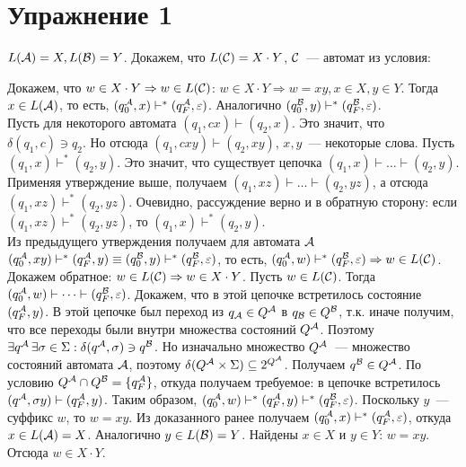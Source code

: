 \documentclass[a4paper]{article}
\def\A{{\cal A}}
\def\B{{\cal B}}
\def\C{{\cal C}}
\begin{document}
\section*{Упражнение 1}
$L(\A)=X,L(\B)=Y$. Докажем, что $L(\C)=X\cdot Y$, $\C$~--- автомат из условия:
\begin{center}
\end{center}
Докажем, что $w\in X\cdot Y\Rightarrow w\in L(\C)$:\newline
$w\in X\cdot Y\Rightarrow w=xy, x\in X, y\in Y$. Тогда $x\in L(\A)$, то есть, $(q_0^\A,x)\vdash^*(q_F^\A,\varepsilon)$. Аналогично $(q_0^\B,y)\vdash^*(q_F^\B,\varepsilon)$.
\\[5pt]
Пусть для некоторого автомата $(q_1,cx)\vdash(q_2,x)$. Это значит, что $\delta(q_1,c)\ni q_2$. Но отсюда $(q_1,cxy)\vdash(q_2,xy)$, $x,y$~--- некоторые слова. Пусть $(q_1,x)\vdash^*(q_2,y)$. Это значит, что существует цепочка $(q_1,x)\vdash\dots\vdash(q_2,y)$. Применяя утверждение выше, получаем $(q_1,xz)\vdash\dots\vdash(q_2,yz)$, а отсюда $(q_1,xz)\vdash^*(q_2,yz)$. Очевидно, рассуждение верно и в обратную сторону: если $(q_1,xz)\vdash^*(q_2,yz)$, то $(q_1,x)\vdash^*(q_2,y)$.
\\[5pt]
Из предыдущего утверждения получаем для автомата $\A$ $(q_0^\A,xy)\vdash^*(q_F^\A,y)\equiv(q_0^\B,y)\vdash^*(q^\B_F,\varepsilon)$, то есть, $(q_0^\A,w)\vdash^*(q_F^\B,\varepsilon)\Rightarrow w\in L(\C)$.\newline
Докажем обратное: $w\in L(\C)\Rightarrow w\in X\cdot Y$.\newline
Пусть $w\in L(\C)$. Тогда $(q_0^\A,w)\vdash\dots\vdash(q_F^\B,\varepsilon)$. Докажем, что в этой цепочке встретилось состояние $(q_F^\A,y)$.\newline
В этой цепочке был переход из $q_\A\in Q^\A$ в $q_\B\in Q^\B$, т.к. иначе получим, что все переходы были внутри множества состояний $Q^\A$. Поэтому $\exists q^\A\,\exists\sigma\in\Sigma:\delta(q^\A,\sigma)\ni q^\B$. Но изначально множество $Q^\A$~--- множество состояний автомата $\A$, поэтому $\delta(Q^\A\times\Sigma)\subseteq 2^{Q^\A}$. Получаем $q^\B\in Q^\A$. По условию $Q^\A\cap Q^\B=\{q_F^\A\}$, откуда получаем требуемое: в цепочке встретилось $(q^\A,\sigma y)\vdash(q_F^\A,y)$.\newline
Таким образом, $(q_0^\A,w)\vdash^*(q_F^\A,y)\vdash^*(q_F^\B,\varepsilon)$. Поскольку $y$~--- суффикс $w$, то $w=xy$. Из доказанного ранее получаем $(q_0^\A,x)\vdash^*(q_F^\A,\varepsilon)$, откуда $x\in L(\A)=X$. Аналогично $y\in L(\B)=Y$. Найдены $x\in X$ и $y\in Y$: $w=xy$. Отсюда $w\in X\cdot Y$.
\end{document}
